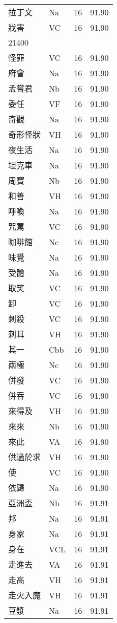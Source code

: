 \documentclass[twocolumn]{book}
\begin{document}
\begin{supertabular}{llrr}
拉丁文 & Na & 16 &  91.90\\
戕害 & VC & 16 &  91.90\\
21400\\
怪罪 & VC & 16 &  91.90\\
府會 & Na & 16 &  91.90\\
孟嘗君 & Nb & 16 &  91.90\\
委任 & VF & 16 &  91.90\\
奇觀 & Na & 16 &  91.90\\
奇形怪狀 & VH & 16 &  91.90\\
夜生活 & Na & 16 &  91.90\\
坦克車 & Na & 16 &  91.90\\
周寶 & Nb & 16 &  91.90\\
和善 & VH & 16 &  91.90\\
呼喚 & Na & 16 &  91.90\\
咒罵 & VC & 16 &  91.90\\
咖啡館 & Nc & 16 &  91.90\\
味覺 & Na & 16 &  91.90\\
受體 & Na & 16 &  91.90\\
取笑 & VC & 16 &  91.90\\
卸 & VC & 16 &  91.90\\
刺殺 & VC & 16 &  91.90\\
刺耳 & VH & 16 &  91.90\\
其一 & Cbb & 16 &  91.90\\
兩極 & Nc & 16 &  91.90\\
併發 & VC & 16 &  91.90\\
併吞 & VC & 16 &  91.90\\
來得及 & VH & 16 &  91.90\\
來來 & Nb & 16 &  91.90\\
來此 & VA & 16 &  91.90\\
供過於求 & VH & 16 &  91.90\\
使 & VC & 16 &  91.90\\
依歸 & Na & 16 &  91.90\\
亞洲盃 & Nb & 16 &  91.91\\
邦 & Na & 16 &  91.91\\
身家 & Na & 16 &  91.91\\
身在 & VCL & 16 &  91.91\\
走進去 & VA & 16 &  91.91\\
走高 & VH & 16 &  91.91\\
走火入魔 & VH & 16 &  91.91\\
豆漿 & Na & 16 &  91.91\\

\end{supertabular}
\end{document}
